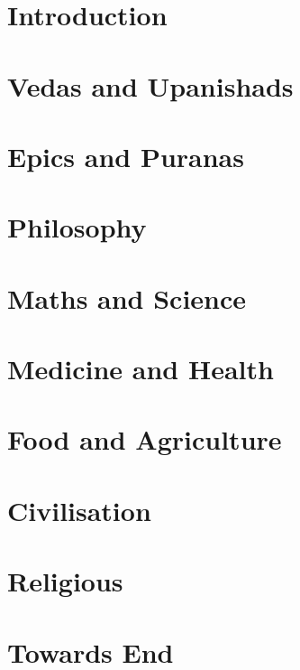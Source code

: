 \section[Intro]{Introduction}


\section[Vedas]{Vedas and Upanishads}







\section[Epics]{Epics and Puranas}




\section[Epics]{Philosophy}


\section[Sci]{Maths and Science}





\section[Health]{Medicine and Health}



\section[Food]{Food and Agriculture}



\section[Civil]{Civilisation}



\section[Religion]{Religious}




\section[End]{Towards End}



